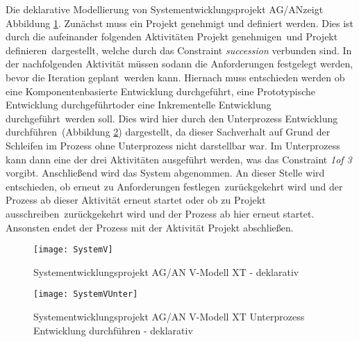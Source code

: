{Die deklarative Modellierung von \grqq Systementwicklungsprojekt AG/AN\grqq  zeigt Abbildung \ref{fig:SystemV}. \newline
Zunächst muss ein Projekt genehmigt und definiert werden. Dies ist durch die aufeinander folgenden Aktivitäten \grqq Projekt genehmigen\grqq \ und \grqq Projekt definieren\grqq \ dargestellt, welche durch das Constraint \textit{succession} verbunden sind.\newline
In der nachfolgenden Aktivität müssen sodann die \grqq Anforderungen festgelegt werden\grqq, bevor die \grqq Iteration geplant\grqq \ werden kann. \newline
Hiernach muss entschieden werden ob eine \grqq Komponentenbasierte Entwicklung durchgeführt\grqq, eine \grqq Prototypische Entwicklung durchgeführt\grqq oder eine \grqq Inkrementelle Entwicklung durchgeführt\grqq \ werden soll. Dies wird hier durch den Unterprozess \grqq Entwicklung durchführen\grqq \ (Abbildung \ref{fig:SystemVUnter}) dargestellt, da dieser Sachverhalt auf Grund der Schleifen im Prozess ohne Unterprozess nicht darstellbar war. Im Unterprozess kann dann eine der drei Aktivitäten ausgeführt werden, was das Constraint \textit{1of 3} vorgibt.\newline
Anschließend wird das \grqq System abgenommen\grqq.
An dieser Stelle wird entschieden, ob erneut zu \grqq Anforderungen festlegen\grqq \ zurückgekehrt wird und der Prozess ab dieser Aktivität erneut startet oder ob zu \grqq Projekt ausschreiben\grqq \ zurückgekehrt wird und der Prozess ab hier erneut startet. Ansonsten endet der Prozess mit der Aktivität \grqq Projekt abschließen\grqq.

\begin{figure}[!htbp]
\begin{center}
  \texttt{[image: SystemV]} %
  \caption{Systementwicklungsprojekt AG/AN  V-Modell XT - deklarativ}
  \label{fig:SystemV}
\end{center}
\end{figure}

\begin{figure}[!htbp]
\begin{center}
  \texttt{[image: SystemVUnter]} %
  \caption{Systementwicklungsprojekt AG/AN  V-Modell XT Unterprozess Entwicklung durchführen - deklarativ}
  \label{fig:SystemVUnter}
\end{center}
\end{figure}



}
